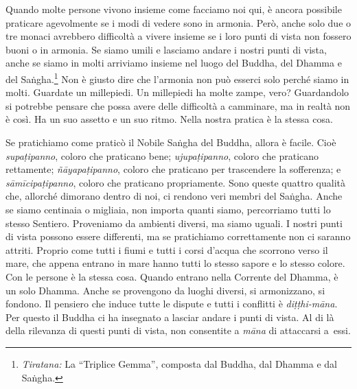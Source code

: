 Quando molte persone vivono insieme come facciamo noi qui, è ancora
possibile praticare agevolmente se i modi di vedere sono in armonia.
Però, anche solo due o tre monaci avrebbero difficoltà a vivere insieme
se i loro punti di vista non fossero buoni o in armonia. Se siamo umili
e lasciamo andare i nostri punti di vista, anche se siamo in molti
arriviamo insieme nel luogo del Buddha, del Dhamma e del
Saṅgha.\footnote{\emph{Tiratana:} La ``Triplice Gemma'', composta dal
  Buddha, dal Dhamma e dal Saṅgha.} Non è giusto dire che l'armonia non
può esserci solo perché siamo in molti. Guardate un millepiedi. Un
millepiedi ha molte zampe, vero? Guardandolo si potrebbe pensare che
possa avere delle difficoltà a camminare, ma in realtà non è così. Ha un
suo assetto e un suo ritmo. Nella nostra pratica è la stessa cosa.

Se pratichiamo come praticò il Nobile Saṅgha del Buddha, allora è
facile. Cioè \emph{supaṭipanno}, coloro che praticano bene;
\emph{ujupaṭipanno}, coloro che praticano rettamente;
\emph{ñāyapaṭipanno}, coloro che praticano per trascendere la
sofferenza; e \emph{sāmīcipaṭipanno}, coloro che praticano propriamente.
Sono queste quattro qualità che, allorché dimorano dentro di noi, ci
rendono veri membri del Saṅgha. Anche se siamo centinaia o migliaia, non
importa quanti siamo, percorriamo tutti lo stesso Sentiero. Proveniamo
da ambienti diversi, ma siamo uguali. I nostri punti di vista possono
essere differenti, ma se pratichiamo correttamente non ci saranno
attriti. Proprio come tutti i fiumi e tutti i corsi d'acqua che scorrono
verso il mare, che appena entrano in mare hanno tutti lo stesso sapore e
lo stesso colore. Con le persone è la stessa cosa. Quando entrano nella
Corrente del Dhamma, è un solo Dhamma. Anche se provengono da luoghi
diversi, si armonizzano, si fondono. Il pensiero che induce tutte le
dispute e tutti i conflitti è \emph{diṭṭhi-māna}. Per questo il Buddha
ci ha insegnato a lasciar andare i punti di vista. Al di là della
rilevanza di questi punti di vista, non consentite a \emph{māna} di
attaccarsi a~essi.

